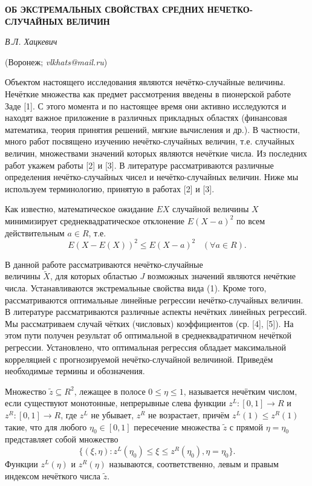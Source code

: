 \begin{center}
    {\bf ОБ ЭКСТРЕМАЛЬНЫХ СВОЙСТВАХ СРЕДНИХ НЕЧЕТКО-СЛУЧАЙНЫХ ВЕЛИЧИН}

    {\it В.Л. Хацкевич}

    (Воронеж; {\it vlkhats@mail.ru})
\end{center}


Объектом настоящего исследования являются нечётко-случайные величины. Нечёткие множества как предмет рассмотрения введены в пионерской работе Заде [1]. С этого момента и по настоящее время они активно исследуются и находят важное приложение в различных прикладных областях (финансовая математика, теория принятия решений, мягкие вычисления и др.). В частности, много работ посвящено изучению нечётко-случайных величин, т.е. случайных величин, множествами значений которых являются нечёткие числа. Из последних работ укажем работы [2] и [3]. В литературе рассматриваются различные определения нечётко-случайных чисел и нечётко-случайных величин. Ниже мы используем терминологию, принятую в работах [2] и [3].



Как известно, математическое ожидание $EX$ случайной величины $X$ минимизирует среднеквадратическое отклонение $E(X-a)^2$ по всем действительным $a\in R$, т.е.
\begin{equation}
E(X-E(X))^2\leq E(X-a)^2\,\,\,\,\,(\forall a\in R).
\end{equation}

В данной работе рассматриваются нечётко-случайные
\\величины $\tilde{X}$, для которых областью $J$ возможных значений являются нечёткие числа. Устанавливаются экстремальные свойства вида (1). Кроме того, рассматриваются оптимальные линейные регрессии нечётко-случайных величин. В литературе рассматриваются различные аспекты нечётких линейных регрессий. Мы рассматриваем случай чётких (числовых) коэффициентов (ср. [4], [5]). На этом пути получен результат об оптимальной в среднеквадратичном нечёткой регрессии. Установлено, что оптимальная регрессия обладает максимальной корреляцией с прогнозируемой нечётко-случайной величиной. Приведём необходимые термины и обозначения.

Множество $\tilde{z}\subseteq R^2$, лежащее в полосе $0\leq \eta\leq 1$, называется нечётким числом, если существуют монотонные, непрерывные слева функции $z^L:[0,1]\rightarrow R$ и $z^R:[0,1]\rightarrow R$, где $z^L$ не убывает, $z^R$ не возрастает, причём $z^L(1)\leq z^R(1)$ такие, что для любого $\eta_0\in[0,1]$ пересечение множества $\tilde{z}$ с прямой $\eta=\eta_0$ представляет собой множество
$$
\{(\xi, \eta): z^L(\eta_0)\leq\xi\leq z^R(\eta_0), \eta=\eta_0\}.
$$
Функции $z^L(\eta)$ и $z^R(\eta)$ называются, соответственно, левым и правым индексом нечёткого числа $\tilde{z}$.

